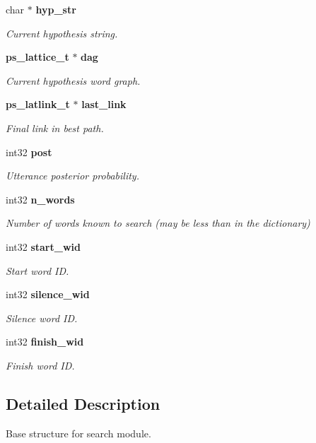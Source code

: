 \begin{DoxyCompactItemize}
char $\ast$ {\bf hyp\-\_\-str}
\begin{DoxyCompactList}\small\item\em Current hypothesis string. \end{DoxyCompactList}\item 
{\bf ps\-\_\-lattice\-\_\-t} $\ast$ {\bf dag}
\begin{DoxyCompactList}\small\item\em Current hypothesis word graph. \end{DoxyCompactList}\item 
{\bf ps\-\_\-latlink\-\_\-t} $\ast$ {\bf last\-\_\-link}
\begin{DoxyCompactList}\small\item\em Final link in best path. \end{DoxyCompactList}\item 
int32 {\bf post}
\begin{DoxyCompactList}\small\item\em Utterance posterior probability. \end{DoxyCompactList}\item 
int32 {\bf n\-\_\-words}\label{structps__search__s_ad4d98deb905bd664ec44313ea0065b1a}

\begin{DoxyCompactList}\small\item\em Number of words known to search (may be less than in the dictionary) \end{DoxyCompactList}\item 
int32 {\bf start\-\_\-wid}
\begin{DoxyCompactList}\small\item\em Start word I\-D. \end{DoxyCompactList}\item 
int32 {\bf silence\-\_\-wid}
\begin{DoxyCompactList}\small\item\em Silence word I\-D. \end{DoxyCompactList}\item 
int32 {\bf finish\-\_\-wid}
\begin{DoxyCompactList}\small\item\em Finish word I\-D. \end{DoxyCompactList}\end{DoxyCompactItemize}


\subsection{Detailed Description}
Base structure for search module. 

